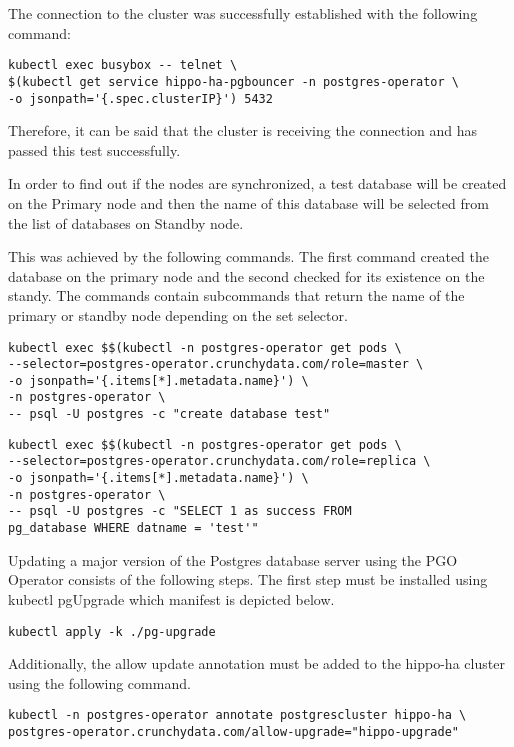 The connection to the cluster was successfully established with the following command:

\begin{verbatim}
kubectl exec busybox -- telnet \
$(kubectl get service hippo-ha-pgbouncer -n postgres-operator \
-o jsonpath='{.spec.clusterIP}') 5432
\end{verbatim}

Therefore, it can be said that the cluster is receiving the connection and has passed this test successfully.

\n{3}{Cluster synchronization}
\label{chap:pgosync}
In order to find out if the nodes are synchronized, a test database will be created on the Primary node and then the name of this database will be selected from the list of databases on Standby node.

This was achieved by the following commands. The first command created the database on the primary node and the second checked for its existence on the standy. The commands contain subcommands that return the name of the primary or standby node depending on the set selector.

\begin{verbatim}
kubectl exec $$(kubectl -n postgres-operator get pods \
--selector=postgres-operator.crunchydata.com/role=master \
-o jsonpath='{.items[*].metadata.name}') \
-n postgres-operator \
-- psql -U postgres -c "create database test"
\end{verbatim}
\begin{verbatim}
kubectl exec $$(kubectl -n postgres-operator get pods \
--selector=postgres-operator.crunchydata.com/role=replica \
-o jsonpath='{.items[*].metadata.name}') \
-n postgres-operator \
-- psql -U postgres -c "SELECT 1 as success FROM 
pg_database WHERE datname = 'test'"
\end{verbatim}

Updating a major version of the Postgres database server using the PGO Operator consists of the following steps. The first step must be installed using kubectl pgUpgrade which manifest is depicted below.
\begin{verbatim}
kubectl apply -k ./pg-upgrade
\end{verbatim}

Additionally, the allow update annotation must be added to the hippo-ha cluster using the following command.
\begin{verbatim}
kubectl -n postgres-operator annotate postgrescluster hippo-ha \
postgres-operator.crunchydata.com/allow-upgrade="hippo-upgrade"
\end{verbatim}


